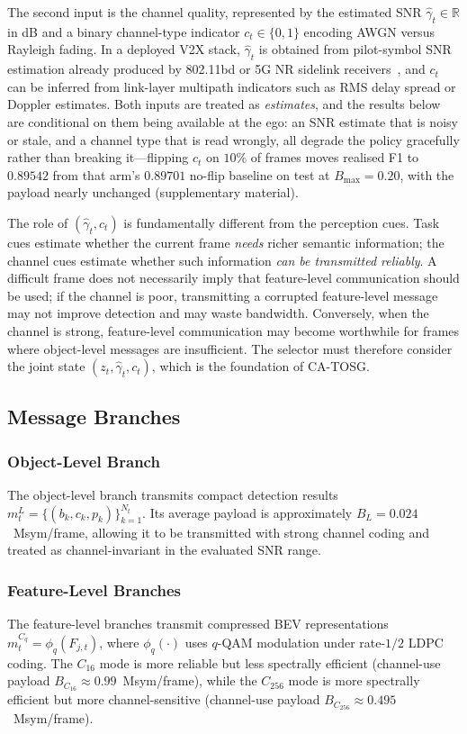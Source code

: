 \documentclass[journal]{IEEEtran}
\newcommand{\method}{CA-TOSG}
\begin{document}
The second input is the channel quality, represented by the estimated SNR $\hat\gamma_t \in \mathbb{R}$ in dB and a binary channel-type indicator $c_t \in \{0,1\}$ encoding AWGN versus Rayleigh fading. In a deployed V2X stack, $\hat\gamma_t$ is obtained from pilot-symbol SNR estimation already produced by 802.11bd or 5G NR sidelink receivers~\cite{ieee80211bd}, and $c_t$ can be inferred from link-layer multipath indicators such as RMS delay spread or Doppler estimates. Both inputs are treated as \emph{estimates}, and the results below are conditional on them being available at the ego: an SNR estimate that is noisy or stale, and a channel type that is read wrongly, all degrade the policy gracefully rather than breaking it---flipping $c_t$ on $10\%$ of frames moves realised F1 to $0.89542$ from that arm's $0.89701$ no-flip baseline on test at $B_{\max}=0.20$, with the payload nearly unchanged (supplementary material).

The role of $(\hat\gamma_t,c_t)$ is fundamentally different from the perception cues. Task cues estimate whether the current frame \emph{needs} richer semantic information; the channel cues estimate whether such information \emph{can be transmitted reliably}. A difficult frame does not necessarily imply that feature-level communication should be used; if the channel is poor, transmitting a corrupted feature-level message may not improve detection and may waste bandwidth. Conversely, when the channel is strong, feature-level communication may become worthwhile for frames where object-level messages are insufficient. The selector must therefore consider the joint state $(z_t,\hat\gamma_t,c_t)$, which is the foundation of \method{}.

\subsection{Message Branches}

\subsubsection{Object-Level Branch}
The object-level branch transmits compact detection results $m_t^L = \{(b_k,c_k,p_k)\}_{k=1}^{N_t}$. Its average payload is approximately $B_L = 0.024$~Msym/frame, allowing it to be transmitted with strong channel coding and treated as channel-invariant in the evaluated SNR range.

\subsubsection{Feature-Level Branches}
The feature-level branches transmit compressed BEV representations $m_t^{C_q} = \phi_q(F_{j,t})$, where $\phi_q(\cdot)$ uses $q$-QAM modulation under rate-$1/2$ LDPC coding. The $C_{16}$ mode is more reliable but less spectrally efficient (channel-use payload $B_{C_{16}} \approx 0.99$~Msym/frame), while the $C_{256}$ mode is more spectrally efficient but more channel-sensitive (channel-use payload $B_{C_{256}} \approx 0.495$~Msym/frame).
\end{document}
